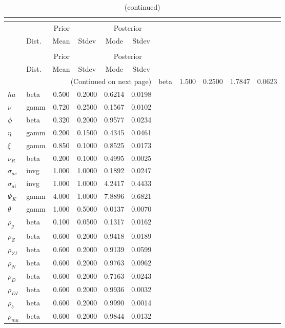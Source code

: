  
\begin{center}
\begin{longtable}{llcccc} 
\caption{Results from posterior maximization (parameters)}\\
 \label{Table:Posterior:1}\\
\toprule 
  & \multicolumn{3}{c}{Prior}  &  \multicolumn{2}{c}{Posterior} \\
  \cmidrule(r{.75em}){2-4} \cmidrule(r{.75em}){5-6}
  & Dist. & Mean  & Stdev & Mode & Stdev \\ 
\midrule \endfirsthead 
\caption{(continued)}\\
 \bottomrule 
  & \multicolumn{3}{c}{Prior}  &  \multicolumn{2}{c}{Posterior} \\
  \cmidrule(r{.75em}){2-4} \cmidrule(r{.75em}){5-6}
  & Dist. & Mean  & Stdev & Mode & Stdev \\ 
\midrule \endhead 
\bottomrule \multicolumn{6}{r}{(Continued on next page)}\endfoot 
\bottomrule\endlastfoot 
${\sigma}$ & beta &   1.500 & 0.2500 &   1.7847 &  0.0623 \\ 
${ha}$ & beta &   0.500 & 0.2000 &   0.6214 &  0.0198 \\ 
$\nu$ & gamm &   0.720 & 0.2500 &   0.1567 &  0.0102 \\ 
${\phi}$ & beta &   0.320 & 0.2000 &   0.9577 &  0.0234 \\ 
${\eta}$ & gamm &   0.200 & 0.1500 &   0.4345 &  0.0461 \\ 
$\xi$ & gamm &   0.850 & 0.1000 &   0.8525 &  0.0173 \\ 
${\nu_R}$ & beta &   0.200 & 0.1000 &   0.4995 &  0.0025 \\ 
${\sigma_{ac}}$ & invg &   1.000 & 1.0000 &   0.1892 &  0.0247 \\ 
${\sigma_{ai}}$ & invg &   1.000 & 1.0000 &   4.2417 &  0.4433 \\ 
${\Psi_{K}}$ & gamm &   4.000 & 1.0000 &   7.8896 &  0.6821 \\ 
${\theta}$ & gamm &   1.000 & 0.5000 &   0.0137 &  0.0070 \\ 
${\rho_g}$ & beta &   0.100 & 0.0500 &   0.1317 &  0.0162 \\ 
${\rho_Z}$ & beta &   0.600 & 0.2000 &   0.9418 &  0.0189 \\ 
${\rho_{ZI}}$ & beta &   0.600 & 0.2000 &   0.9139 &  0.0599 \\ 
${\rho_N}$ & beta &   0.600 & 0.2000 &   0.9763 &  0.0962 \\ 
${\rho_D}$ & beta &   0.600 & 0.2000 &   0.7163 &  0.0243 \\ 
${\rho_{DI}}$ & beta &   0.600 & 0.2000 &   0.9936 &  0.0032 \\ 
${\rho_b}$ & beta &   0.600 & 0.2000 &   0.9990 &  0.0014 \\ 
${\rho_{mu}}$ & beta &   0.600 & 0.2000 &   0.9844 &  0.0132 \\ 
\end{longtable}
 \end{center}
